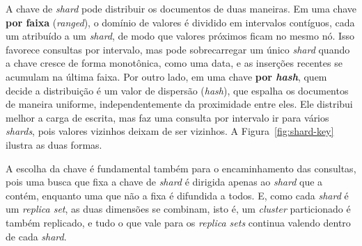 A chave de \textit{shard} pode distribuir os documentos de duas maneiras. Em uma chave \textbf{por faixa} (\textit{ranged}), o domínio de valores é dividido em intervalos contíguos, cada um atribuído a um \textit{shard}, de modo que valores próximos ficam no mesmo nó. Isso favorece consultas por intervalo, mas pode sobrecarregar um único \textit{shard} quando a chave cresce de forma monotônica, como uma data, e as inserções recentes se acumulam na última faixa. Por outro lado, em uma chave \textbf{por \textit{hash}}, quem decide a distribuição é um valor de dispersão (\textit{hash}), que espalha os documentos de maneira uniforme, independentemente da proximidade entre eles. Ele distribui melhor a carga de escrita, mas faz uma consulta por intervalo ir para vários \textit{shards}, pois valores vizinhos deixam de ser vizinhos. A Figura~\ref{fig:shard-key} ilustra as duas formas.

A escolha da chave é fundamental também para o encaminhamento das consultas, pois uma busca que fixa a chave de \textit{shard} é dirigida apenas ao \textit{shard} que a contém, enquanto uma que não a fixa é difundida a todos. E, como cada \textit{shard} é um \textit{replica set}, as duas dimensões se combinam, isto é, um \textit{cluster} particionado é também replicado, e tudo o que vale para os \textit{replica sets} continua valendo dentro de cada \textit{shard}.